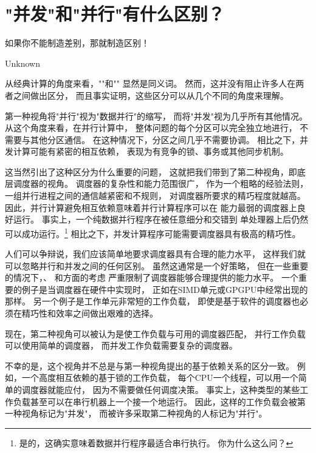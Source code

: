 
\section{"并发"和"并行"有什么区别？}
\label{sec:app:questions:What is the Difference Between ``Concurrent'' and ``Parallel''?}
%
\epigraph{如果你不能制造差别，那就制造区别！}
	 {Unknown}

从经典计算的角度来看，""和""
显然是同义词。
然而，这并没有阻止许多人在两者之间做出区分，
而且事实证明，这些区分可以从几个不同的角度来理解。

第一种视角将"并行"视为"数据并行"的缩写，
而将"并发"视为几乎所有其他情况。
从这个角度来看，在并行计算中，
整体问题的每个分区可以完全独立地进行，
不需要与其他分区通信。
在这种情况下，分区之间几乎不需要协调。
相比之下，并发计算可能有紧密的相互依赖，
表现为有竞争的锁、事务或其他同步机制。

\QuickQuizEnd

这当然引出了这种区分为什么重要的问题，
这就把我们带到了第二种视角，即底层调度器的视角。
调度器的复杂性和能力范围很广，
作为一个粗略的经验法则，一组并行进程之间的通信越紧密和不规则，
对调度器所要求的精巧程度就越高。
因此，并行计算避免相互依赖意味着并行计算程序可以在
能力最弱的调度器上良好运行。
事实上，一个纯数据并行程序在被任意细分和交错到
单处理器上后仍然可以成功运行。\footnote{
	是的，这确实意味着数据并行程序最适合串行执行。
	你为什么这么问？}
相比之下，并发计算程序可能需要调度器具有极高的精巧性。

人们可以争辩说，我们应该简单地要求调度器具有合理的能力水平，
这样我们就可以忽略并行和并发之间的任何区别。
虽然这通常是一个好策略，
但在一些重要的情况下，、
和方面的考虑
严重限制了调度器能够合理提供的能力水平。
一个重要的例子是当调度器在硬件中实现时，
正如在SIMD单元或GPGPU中经常出现的那样。
另一个例子是工作单元非常短的工作负载，
即使是基于软件的调度器也必须在精巧性和效率之间做出艰难的选择。

现在，第二种视角可以被认为是使工作负载与可用的调度器匹配，
并行工作负载可以使用简单的调度器，
而并发工作负载需要复杂的调度器。

不幸的是，这个视角并不总是与第一种视角提出的基于依赖关系的区分一致。
例如，一个高度相互依赖的基于锁的工作负载，
每个CPU一个线程，可以用一个简单的调度器就能应付，
因为不需要做任何调度决策。
事实上，这种类型的某些工作负载甚至可以在串行机器上一个接一个地运行。
因此，这样的工作负载会被第一种视角标记为"并发"，
而被许多采取第二种视角的人标记为"并行"。

